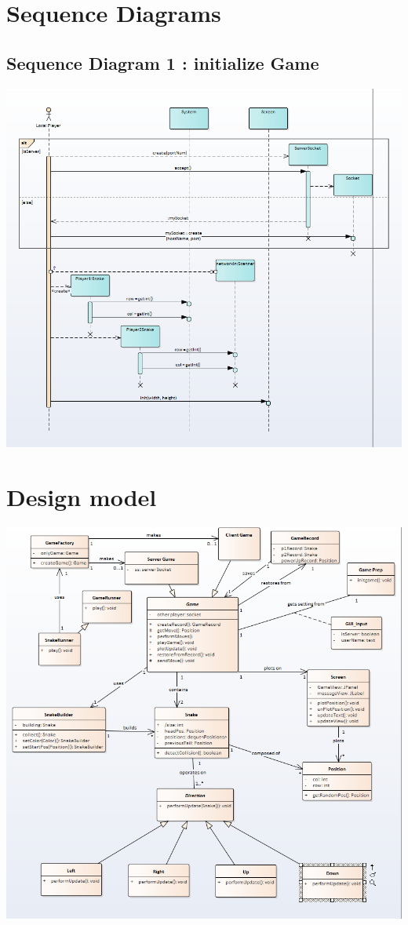\documentclass[titlepage]{article}
\begin{document}
	
	
	\section{Sequence Diagrams}
	\subsection{Sequence Diagram 1 : initialize Game}
	\includegraphics[scale=.75]{Sequence1}
	
	\section{Design model}
	\includegraphics[scale=.75]{DesignModel}
	
\end{document}
